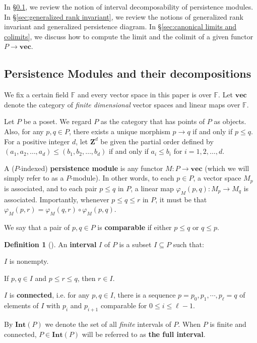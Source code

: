 \documentclass[11pt]{article}
\theoremstyle{definition}
\newtheorem{definition}[theorem]{Definition}
\newcommand{\Int}{\mathbf{Int}}
\newcommand{\Pb}{P}
\newcommand{\vect}{\mathbf{vec}}
\newcommand{\F}{\mathbb{F}}
\newcommand{\Z}{\mathbf{Z}}
\begin{document}
In \S\ref{sec:persistence modules}, we review the notion of interval decomposability of persistence modules. In \S\ref{sec:generalized rank invariant}, we review the notions of generalized rank invariant and generalized persistence diagram. In \S\ref{sec:canonical limits and colimits}, we discuss how to compute the limit and the colimit of a given functor $\Pb\rightarrow \vect$.

\subsection{Persistence Modules and their decompositions}\label{sec:persistence modules}

We fix a certain field $\F$ and every vector space in this paper is over $\F$. Let $\vect$ denote the category of \emph{finite dimensional} vector spaces  and linear maps over $\F$.

Let $\Pb$ be a poset. We regard $\Pb$ as the category that has points of $\Pb$ as objects. Also, for any $p,q\in \Pb$, there exists a unique morphism $p\rightarrow q$ if and only if $p\leq q$. For a positive integer $d$, let $\Z^d$ be given the partial order defined by $(a_1,a_2,\ldots,a_d)\leq (b_1,b_2,\ldots,b_d)$ if and only if $a_i\leq b_i$ for $i=1,2,\ldots,d$.  

A ($\Pb$-indexed) \textbf{persistence module} is any functor $M:\Pb\rightarrow \vect$ (which we will simply refer to as a $P$-module). In other words, to each $p\in \Pb$, a vector space $M_p$ is associated, and to each pair $p\leq q$ in $\Pb$, a linear map $\varphi_{M}(p,q):M_p\rightarrow M_q$ is associated. Importantly, whenever $p\leq q\leq r$ in $\Pb$, it must be that $\varphi_M(p,r)=\varphi_M(q,r)\circ \varphi_M(p,q)$. 

We say that a pair of $p,q\in \Pb$ is \textbf{comparable} if either $p\leq q$ or $q\leq p$. 

\begin{definition}[{\cite{botnan2018algebraic}}]\label{def:intervals}
An \textbf{interval} $I$ of $\Pb$ is a subset $I\subseteq \Pb$ such that: 	
\begin{enumerate*}[label=(\roman*)]
    \item $I$ is nonempty.    
    \item If $p,q\in I$ and $p\leq r\leq q$, then $r\in I$. \label{item:convexity}
    \item $I$ is \textbf{connected}, i.e. for any $p,q\in I$, there is a sequence $p=p_0,
		p_1,\cdots,p_\ell=q$ of elements of $I$ with $p_i$ and $p_{i+1}$ comparable for $0\leq i\leq \ell-1$.\label{item:interval3}
\end{enumerate*}
By $\Int(\Pb)$ we denote the set of all \emph{finite} intervals of $\Pb$. When $\Pb$ is finite and  connected, $P\in \Int(\Pb)$ will be referred to as  \textbf{the full interval}.
\end{definition}
\end{document}
